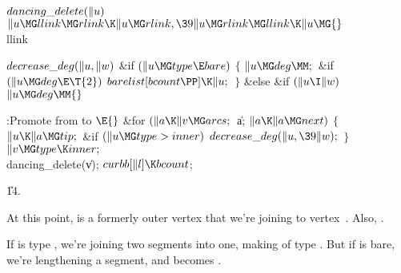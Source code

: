 \Y\B\4\D$\\{dancing\_delete}(\|u)$ \5
$\|u\MG\\{llink}\MG\\{rlink}\K\|u\MG\\{rlink},\39\|u\MG\\{rlink}\MG\\{llink}\K%
\|u\MG{}$\\{llink}\par
\B\4\D$\\{decrease\_deg}(\|u,\|w)$ \6
\&{if} ${}(\|u\MG\\{type}\E\\{bare}){}$\5
${}\{{}$\1\6
${}\|u\MG\\{deg}\MM;{}$\6
\&{if} ${}(\|u\MG\\{deg}\E\T{2}){}$\1\5
${}\\{barelist}[\\{bcount}\PP]\K\|u;{}$\2\6
\4${}\}{}$\5
\2\&{else} \&{if} ${}(\|u\I\|w)$ $\|u\MG\\{deg}\MM{}$\par
\Y\B\4:Promote  from  to \X${}\E{}$\6
\&{for} ${}(\|a\K\|v\MG\\{arcs};{}$ \|a; ${}\|a\K\|a\MG\\{next}){}$\5
${}\{{}$\1\6
${}\|u\K\|a\MG\\{tip};{}$\6
\&{if} ${}(\|u\MG\\{type}>\\{inner}){}$\1\5
${}\\{decrease\_deg}(\|u,\39\|w);{}$\2\6
\4${}\}{}$\2\6
${}\|v\MG\\{type}\K\\{inner};{}$\6
\\{dancing\_delete}(\|v);\6
${}\\{curbb}[\|l]\K\\{bcount}{}$;\par
\U14.\fi

At this point,  is a formerly outer vertex that
we're joining to
vertex~. Also, .

If  is type , we're joining two segments into one, making
 of type .
But if  is bare, we're lengthening a segment, and  becomes .

